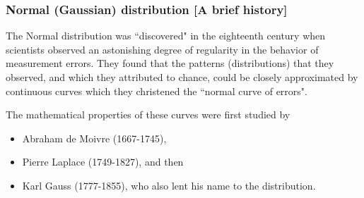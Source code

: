 \documentclass[notes=show,smaller,handout]{beamer}\usepackage[]{graphicx}\usepackage[]{color}
\newenvironment{stepitemize}{\begin{itemize}[<+->]}{\end{itemize} }
\begin{document}
\begin{frame}%

\frametitle{Normal (Gaussian) distribution [A brief history]}

The Normal distribution was ``discovered" in the eighteenth
century when scientists observed an astonishing degree of
regularity in the behavior of measurement errors. They found that
the patterns (distributions) that they observed, and which they
attributed to chance, could be closely approximated by continuous
curves which they christened the ``normal curve of errors".

\vspace{0.4cm}

The mathematical properties of these curves were first studied by
\begin{stepitemize}
\item Abraham de Moivre (1667-1745),
\item Pierre Laplace (1749-1827), and then
\item Karl Gauss (1777-1855), who also lent his name to the
distribution.
\end{stepitemize}

\end{frame}%

\end{document}
